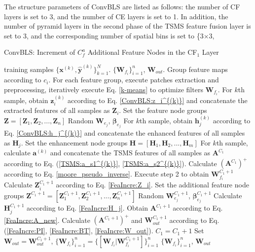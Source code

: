 \documentclass[lettersize,journal]{IEEEtran}
\begin{document}
The structure parameters of ConvBLS are listed as follows: the number of CF layers is set to 3, and the number of CE layers is set to 1. In addition, the number of pyramid layers in the second phase of the TSMS feature fusion layer is set to 3, and the corresponding number of spatial bins is set to \{3$\times$3,
\begin{algorithm}[H]
\renewcommand{\algorithmicrequire}{\textbf{Input:}}
\renewcommand{\algorithmicensure}{\textbf{Output:}}
\caption{ConvBLS: Increment of $C^a_f$ Additional Feature Nodes in the CF$_1$ Layer}
\label{alg:FeatureIncremental}
\begin{algorithmic}[1]
\REQUIRE training samples $\{\textbf{x}^{(k)}, \hat{\textbf{y}}^{(k)}\}_{k=1}^{N}$.
\ENSURE $\{\textbf{W}_{f_i}\}_{i=1}^{n}$, $\textbf{W}_{out}$.
\STATE Group feature maps according to $c_i$. For each feature group, execute patches extraction and preprocessing, iteratively execute Eq. \eqref{k-means} to optimize filters $\textbf{W}_{f_i}$.
\STATE For $k$th sample, obtain $\textbf{z}_i^{(k)}$ according to Eq. \eqref{ConvBLS:z_i^{(k)}} and concatenate the extracted features of all samples as $\textbf{Z}_i$.
\ENDFOR
\STATE Set the feature node groups $\mathbf{Z}=[\textbf{Z}_1,\textbf{Z}_2,...,\textbf{Z}_n]$
\STATE Random $\textbf{W}_{e_j}$, $\mathbf{\beta}_{e_j}$
\STATE For $k$th sample, obtain $\textbf{h}_j^{(k)}$ according to Eq. \eqref{ConvBLS:h_j^{(k)}} and concatenate the enhanced features of all samples as $\textbf{H}_j$. 
\ENDFOR
\STATE Set the enhancement node groups $\textbf{H}=[\textbf{H}_1,\textbf{H}_2,...,\textbf{H}_m]$
\STATE For $k$th sample, calculate  $\mathbf{a}^{(k)}$ and concatenate the TSMS features of all samples as $\mathbf{A}^{C_1}$ according to Eq. (\ref{TSMS:a_s1^{(k)}}, \ref{TSMS:a_s2^{(k)}}).
\STATE Calculate $(\mathbf{A}^{C_1})^{+}$ according to Eq. \eqref{moore_pseudo_inverse}.
\STATE Execute step 2 to obtain $\textbf{W}_{f_i}^{C_1+1}$
\STATE Calculate $\bm{Z}_i^{C_1+1}$ according to Eq. \eqref{FeaIncre:Z_i}. 
\ENDFOR
\STATE Set the additional feature node groups $\bm{Z}^{C_1+1}=[\bm{Z}_{1}^{C_1+1},\bm{Z}_{2}^{C_1+1},...,\bm{Z}_{n}^{C_1+1}]$
\STATE Random $\textbf{W}_{e_j}^{C_1+1}$, $\mathbf{\beta}_{e_j}^{C_1+1}$
\STATE \vspace{0.5pt}Calculate $\mathbf{H}_{j}^{C_1+1}$ according to Eq. \eqref{FeaIncre:H_j}.
\ENDFOR
\STATE Obtain $\bm{A}^{C_1+1}$ according to Eq. \eqref{FeaIncre:A_new}. Calculate $(\mathbf{A}^{C_1+1})^{+}$ and $\mathbf{W}_{out}^{C_1+1}$ according to Eq. (\ref{FeaIncre:PI}, \ref{FeaIncre:BT}, \ref{FeaIncre:W_out}).
\STATE $C_1=C_1+1$
\ENDWHILE
\STATE Set $\mathbf{W}_{out}=\mathbf{W}_{out}^{C_1+1}$, $\{\mathbf{W}_{f_i}\}_{i=1}^{n}=\{[\mathbf{W}_{f_i}|\mathbf{W}_{f_i}^{C_1+1} ]\}_{i=1}^{n}$
\RETURN $\{\textbf{W}_{f_i}\}_{i=1}^{n}$, $\mathbf{W}_{out}$
\end{algorithmic}
\end{algorithm}
\end{document}
